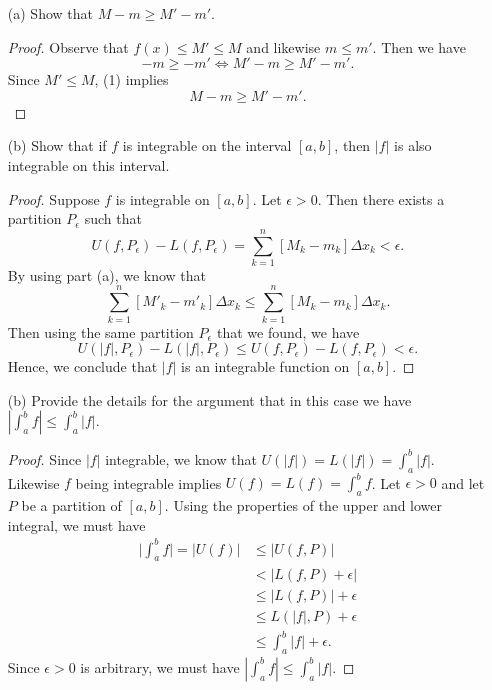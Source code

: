 \begin{enumerate}
    \item[(a)] Show that \( M - m \geq M' - m' \).
		\begin{proof}
		Observe that \( f(x) \leq M' \leq M \) and likewise \( m \leq m'  \). Then we have  
		\[  -m \geq -m' \iff M' - m \geq M' - m'. \tag{1}\]
		Since \( M' \leq M \), (1) implies 
		\[  M - m \geq M' - m'. \]
		\end{proof}
	\item[(b)] Show that if \( f  \) is integrable on the interval \( [a,b]  \), then \( | f |  \) is also integrable on this interval.
		\begin{proof}
			Suppose \( f \) is integrable on \( [a,b] \). Let \( \epsilon > 0  \). Then there exists a partition \(  P_{\epsilon } \) such that 
			\[  U(f,P_{\epsilon } ) - L(f, P_{\epsilon }) = \sum_{ k=1 }^{ n } [M_{k } - m_{k }] \Delta x_{k} < \epsilon. \]
			By using part (a), we know that 
			\[  \sum_{ k=1 }^{ n } [M'_{k } - m'_{k }] \Delta x_{k } \leq \sum_{ k=1 }^{ n } [ M_{k } - m_{k } ] \Delta x_{k }. \]
			Then using the same partition \( P_{\epsilon } \) that we found, we have 
			\[ U(| f | , P_{\epsilon } ) - L(| f | , P_{\epsilon } ) \leq U(f , P_{\epsilon }) - L( f  , P_{\epsilon }) < \epsilon. \] Hence, we conclude that \( | f |  \) is an integrable function on \( [a,b]  \). 
		\end{proof}
	\item[(b)] Provide the details for the argument that in this case we have \( | \int_{ a }^{ b } f  | \leq \int_{ a }^{ b } | f | \).
		\begin{proof}
			Since \( | f |  \) integrable, we know that \( U(| f | ) = L(| f | ) = \int_{ a }^{ b } | f |    \). Likewise \( f \) being integrable implies \( U( f ) = L(f) = \int_{ a }^{ b } f   \). Let \( \epsilon > 0 \) and let \( P \) be a partition of \( [a,b]  \). Using the properties of the upper and lower integral, we must have 
		\begin{align*}
		    \Big| \int_{ a }^{ b } f  \Big| = | U(f)  |   
											&\leq | U(f,P)  | \\
											&< \Big| L(f,P) + \epsilon  \Big| \\  
											&\leq | L(f,P)  | + \epsilon \\
											&\leq L(| f | , P) + \epsilon \\
											&\leq \int_{ a }^{ b } | f | + \epsilon. 
		\end{align*}
		Since \( \epsilon > 0  \) is arbitrary, we must have \( | \int_{ a }^{ b } f  |  \leq \int_{ a }^{ b } | f |   \). 
		\end{proof}
\end{enumerate}

